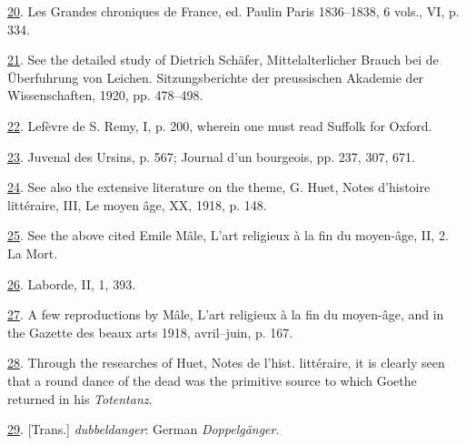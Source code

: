 \protect\hypertarget{23_NOTES.xhtmlux5cux23id_1313}{\protect\hyperlink{12_Chapter_Five__THE_VISION_OF_DEAT.xhtmlux5cux23id_1312}{20}}.
Les Grandes chroniques de France, ed. Paulin Paris 1836--1838, 6 vols.,
VI, p. 334.

\protect\hypertarget{23_NOTES.xhtmlux5cux23id_1311}{\protect\hyperlink{12_Chapter_Five__THE_VISION_OF_DEAT.xhtmlux5cux23id_1310}{21}}.
See the detailed study of Dietrich Schäfer, Mittelalterlicher Brauch bei
de Überfuhrung von Leichen. Sitzungsberichte der preussischen Akademie
der Wissenschaften, 1920, pp. 478--498.

\protect\hypertarget{23_NOTES.xhtmlux5cux23id_1309}{\protect\hyperlink{12_Chapter_Five__THE_VISION_OF_DEAT.xhtmlux5cux23id_1308}{22}}.
Lefèvre de S. Remy, I, p. 200, wherein one must read Suffolk for Oxford.

\protect\hypertarget{23_NOTES.xhtmlux5cux23id_1307}{\protect\hyperlink{12_Chapter_Five__THE_VISION_OF_DEAT.xhtmlux5cux23id_1306}{23}}.
Juvenal des Ursins, p. 567; Journal d'un bourgeois, pp. 237, 307, 671.

\protect\hypertarget{23_NOTES.xhtmlux5cux23id_1305}{\protect\hyperlink{12_Chapter_Five__THE_VISION_OF_DEAT.xhtmlux5cux23id_1304}{24}}.
See also the extensive literature on the theme, G. Huet, Notes
d'histoire littéraire, III, Le moyen âge, XX, 1918, p. 148.

\protect\hypertarget{23_NOTES.xhtmlux5cux23id_1303}{\protect\hyperlink{12_Chapter_Five__THE_VISION_OF_DEAT.xhtmlux5cux23id_1302}{25}}.
See the above cited Emile Mâle, L'art religieux à la fin du moyen-âge,
II, 2. La Mort.

\protect\hypertarget{23_NOTES.xhtmlux5cux23id_1301}{\protect\hyperlink{12_Chapter_Five__THE_VISION_OF_DEAT.xhtmlux5cux23id_1300}{26}}.
Laborde, II, 1, 393.

\protect\hypertarget{23_NOTES.xhtmlux5cux23id_1299}{\protect\hyperlink{12_Chapter_Five__THE_VISION_OF_DEAT.xhtmlux5cux23id_1298}{27}}.
A few reproductions by Mâle, L'art religieux à la fin du moyen-âge, and
in the Gazette des beaux arts 1918, avril--juin, p. 167.

\protect\hypertarget{23_NOTES.xhtmlux5cux23id_1297}{\protect\hyperlink{12_Chapter_Five__THE_VISION_OF_DEAT.xhtmlux5cux23id_1296}{28}}.
Through the researches of Huet, Notes de l'hist. littéraire, it is
clearly seen that a round dance of the dead was the primitive source to
which Goethe returned in his \emph{Totentanz}.

\protect\hypertarget{23_NOTES.xhtmlux5cux23id_1295}{\protect\hyperlink{12_Chapter_Five__THE_VISION_OF_DEAT.xhtmlux5cux23id_1294}{29}}.
{[}Trans.{]} \emph{dubbeldanger}: German \emph{Doppelgänger}.

